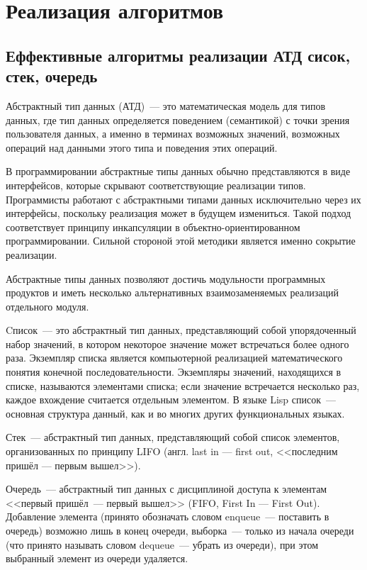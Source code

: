 \documentclass[
	12pt,
	paper=A4,
	oneside,
	draft
]{scrreprt}
\begin{document}
\chapter{Реализация алгоритмов}
\section{Еффективные алгоритмы реализации АТД сисок, стек, очередь}
\thispagestyle{empty}

Абстрактный тип данных (АТД)~--- это математическая модель для типов данных, где тип данных определяется поведением (семантикой) с точки зрения пользователя данных, а именно в терминах возможных значений, возможных операций над данными этого типа и поведения этих операций.

В программировании абстрактные типы данных обычно представляются в виде интерфейсов, которые скрывают соответствующие реализации типов. Программисты работают с абстрактными типами данных исключительно через их интерфейсы, поскольку реализация может в будущем измениться. Такой подход соответствует принципу инкапсуляции в объектно-ориентированном программировании. Сильной стороной этой методики является именно сокрытие реализации. 

Абстрактные типы данных позволяют достичь модульности программных продуктов и иметь несколько альтернативных взаимозаменяемых реализаций отдельного модуля.

Cписок~--- это абстрактный тип данных, представляющий собой упорядоченный набор значений, в котором некоторое значение может встречаться более одного раза. Экземпляр списка является компьютерной реализацией математического понятия конечной последовательности. Экземпляры значений, находящихся в списке, называются элементами списка; если значение встречается несколько раз, каждое вхождение считается отдельным элементом. В языке Lisp список~--- основная структура данный, как и во многих других функциональных языках.

Стек~--- абстрактный тип данных, представляющий собой список элементов, организованных по принципу LIFO (англ. last in — first out, <<последним пришёл — первым вышел>>).

Очередь~--- абстрактный тип данных с дисциплиной доступа к элементам <<первый пришёл~--- первый вышел>> (FIFO, First In — First Out). Добавление элемента (принято обозначать словом enqueue~---  поставить в очередь) возможно лишь в конец очереди, выборка~--- только из начала очереди (что принято называть словом dequeue~--- убрать из очереди), при этом выбранный элемент из очереди удаляется.
\end{document}
